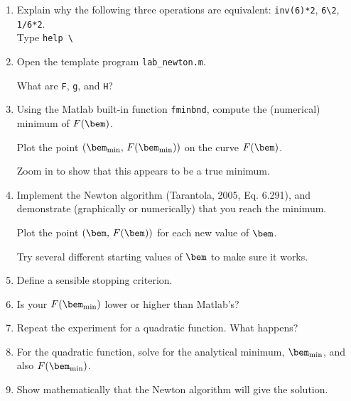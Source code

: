 \documentclass[11pt,titlepage,fleqn]{article}
\newcommand{\vertgap}{\vspace{1cm}}
\begin{document}
\begin{enumerate}
\item Explain why the following three operations are equivalent: \verb+inv(6)*2+, \verb+6\2+, \verb+1/6*2+. \\
Type \verb+help \+

\item Open the template program \verb+lab_newton.m+.

What are \verb+F+, \verb+g+, and \verb+H+?

\vertgap

\item Using the Matlab built-in function \verb+fminbnd+, compute the (numerical) minimum of $F(\bem)$.

Plot the point $(\bem_{\rm min},\,F(\bem_{\rm min}))$ on the curve $F(\bem)$.

Zoom in to show that this appears to be a true minimum.

\item Implement the Newton algorithm (Tarantola, 2005, Eq. 6.291), and demonstrate (graphically or numerically) that you reach the minimum.

Plot the point $(\bem,\,F(\bem))$ for each new value of $\bem$.

Try several different starting values of $\bem$ to make sure it works.

\item Define a sensible stopping criterion.

\vertgap

\item Is your $F(\bem_{\rm min})$ lower or higher than Matlab's?

\vertgap

\item Repeat the experiment for a quadratic function. What happens?

\vertgap

\item For the quadratic function, solve for the analytical minimum, $\bem_{\rm min}$, and also $F(\bem_{\rm min})$.

\vertgap

\item Show mathematically that the Newton algorithm will give the solution.

\end{enumerate}

%
%

\end{document}
